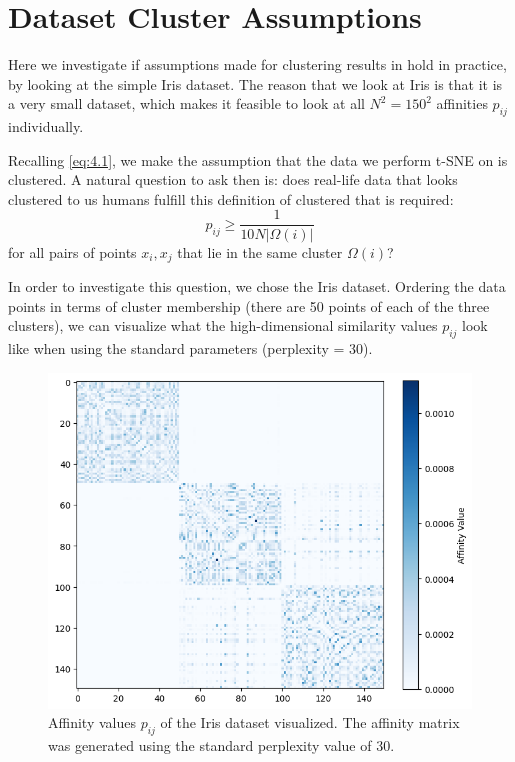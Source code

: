 \section{Dataset Cluster Assumptions}
Here we investigate if assumptions made for clustering results in \cite{LinStei22} hold in practice, by looking at the simple Iris dataset. 
The reason that we look at Iris is that it is a very small dataset, which makes it feasible to look at all $N^2 = 150^2$ affinities $p_{ij}$ individually.  

Recalling \ref{eq:4.1}, we make the assumption that the data we perform t-SNE on is clustered. 
A natural question to ask then is: does real-life data that looks clustered to us humans fulfill this definition of clustered that is required: 
\begin{equation}
    p_{ij} \geq \frac{1}{10 N |\Omega(i)|}
\end{equation}
for all pairs of points $x_i, x_j$ that lie in the same cluster $\Omega(i)$? 

In order to investigate this question, we chose the Iris dataset. 
Ordering the data points in terms of cluster membership (there are 50 points of each of the three clusters), we can visualize what the high-dimensional similarity values $p_{ij}$ look like when using the standard parameters (perplexity = 30). 

\begin{figure}[h]
    \centering 
        \includegraphics[width=0.7\linewidth]{figures/iris_affinity_matrix.png}
        \caption{Affinity values $p_{ij}$ of the Iris dataset visualized. The affinity matrix was generated using the standard perplexity value of 30.}
    \label{fig:iris_affinities}
\end{figure}

